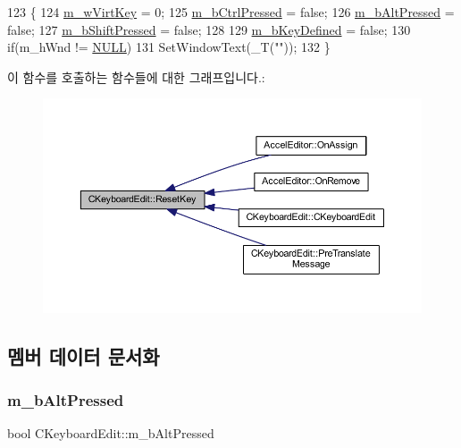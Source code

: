 \begin{DoxyCode}
123 \{
124   \mbox{\hyperlink{class_c_keyboard_edit_a6a4efef92e151002720d0d930db29521}{m\_wVirtKey}} = 0;
125   \mbox{\hyperlink{class_c_keyboard_edit_a0dbb417bbaaeaa95c00fceaecd210064}{m\_bCtrlPressed}} = \textcolor{keyword}{false};
126   \mbox{\hyperlink{class_c_keyboard_edit_a724b035848eeca7bebc24e1309afeb6d}{m\_bAltPressed}} = \textcolor{keyword}{false};
127   \mbox{\hyperlink{class_c_keyboard_edit_ac4a4f45be9ef923961ab92a48a28f789}{m\_bShiftPressed}} = \textcolor{keyword}{false};
128   
129   \mbox{\hyperlink{class_c_keyboard_edit_a9bf24703c8d1a3a019b43dc67c26c3a0}{m\_bKeyDefined}} = \textcolor{keyword}{false};
130   \textcolor{keywordflow}{if}(m\_hWnd != \mbox{\hyperlink{getopt1_8c_a070d2ce7b6bb7e5c05602aa8c308d0c4}{NULL}})
131     SetWindowText(\_T(\textcolor{stringliteral}{""}));
132 \}
\end{DoxyCode}
이 함수를 호출하는 함수들에 대한 그래프입니다.\+:
\nopagebreak
\begin{figure}[H]
\begin{center}
\leavevmode
\includegraphics[width=350pt]{class_c_keyboard_edit_ad0185cc0cad77250cc32ef1d9ffb8593_icgraph}
\end{center}
\end{figure}


\subsection{멤버 데이터 문서화}
\mbox{\label{class_c_keyboard_edit_a724b035848eeca7bebc24e1309afeb6d}} 
\subsubsection{\texorpdfstring{m\+\_\+b\+Alt\+Pressed}{m\_bAltPressed}}
{\footnotesize\ttfamily bool C\+Keyboard\+Edit\+::m\+\_\+b\+Alt\+Pressed}



